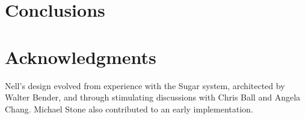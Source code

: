 \documentclass{acm_proc_article-sp}
\begin{document}
\section{Conclusions}

\section{Acknowledgments}
Nell's design evolved from experience with the Sugar system,
architected by Walter Bender, and through stimulating discussions with
Chris Ball and Angela Chang.  Michael Stone also contributed to an
early implementation.

%

%
%
\balancecolumns
\end{document}
